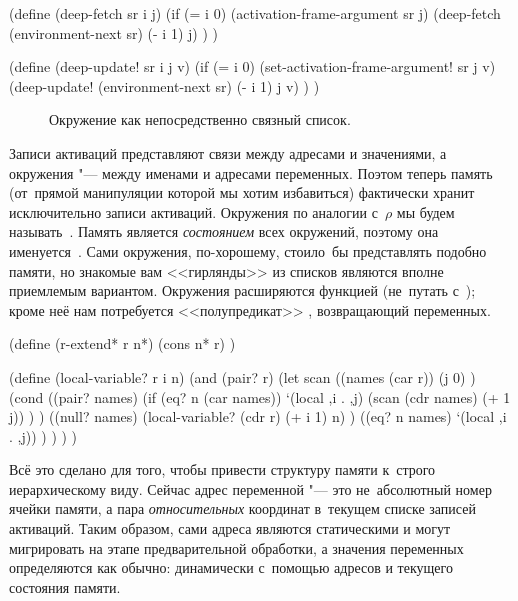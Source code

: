 \begin{code:lisp}
(define (deep-fetch sr i j)
  (if (= i 0)
      (activation-frame-argument sr j)
      (deep-fetch (environment-next sr) (- i 1) j) ) )

(define (deep-update! sr i j v)
  (if (= i 0)
      (set-activation-frame-argument! sr j v)
      (deep-update! (environment-next sr) (- i 1) j v) ) )
\end{code:lisp}

\begin{figure}[ht]\begin{center}

\end{center}%
\caption{Окружение как непосредственно связный список.}%
\label{fast/fast/activations/fig:env-linked}%
\end{figure}

Записи активаций представляют связи между адресами и значениями, а окружения
"--- между именами и адресами переменных. Поэтом теперь память (от~прямой
манипуляции которой мы хотим избавиться) фактически хранит исключительно записи
активаций. Окружения по аналогии с~$\rho$ мы будем называть~. Память
является \emph{состоянием} всех окружений, поэтому она именуется~. Сами
окружения, по-хорошему, стоило~бы представлять подобно памяти, но знакомые вам
<<гирлянды>> из списков  являются вполне приемлемым
вариантом. Окружения расширяются функцией  (не~путать
с~); кроме неё нам потребуется <<полупредикат>>
, возвращающий  переменных.

\begin{code:lisp}
(define (r-extend* r n*)
  (cons n* r) )

(define (local-variable? r i n)
  (and (pair? r)
       (let scan ((names (car r))
                  (j 0) )
         (cond ((pair? names)
                (if (eq? n (car names))
                    `(local ,i . ,j)
                    (scan (cdr names) (+ 1 j)) ) )
               ((null? names)
                (local-variable? (cdr r) (+ i 1) n) )
               ((eq? n names) `(local ,i . ,j)) ) ) ) )
\end{code:lisp}

Всё это сделано для того, чтобы привести структуру памяти к~строго
иерархическому виду. Сейчас адрес переменной "--- это не~абсолютный номер ячейки
памяти, а пара \emph{относительных} координат в~текущем списке записей
активаций. Таким образом, сами адреса являются статическими и могут мигрировать
на этапе предварительной обработки, а значения переменных определяются как
обычно: динамически с~помощью адресов и текущего состояния памяти.

